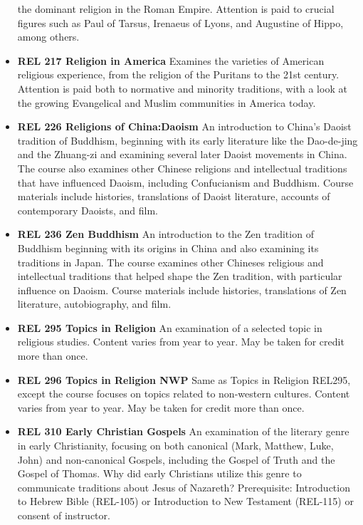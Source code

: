 \documentclass[
  letterpaper,
]{scrbook}
\begin{document}
\begin{itemize}
  the dominant religion in the Roman Empire. Attention is paid to
  crucial figures such as Paul of Tarsus, Irenaeus of Lyons, and
  Augustine of Hippo, among others.\\
\item
  \textbf{REL 217 Religion in America} Examines the varieties of
  American religious experience, from the religion of the Puritans to
  the 21st century. Attention is paid both to normative and minority
  traditions, with a look at the growing Evangelical and Muslim
  communities in America today.
\item
  \textbf{REL 226 Religions of China:Daoism} An introduction to China's
  Daoist tradition of Buddhism, beginning with its early literature like
  the Dao-de-jing and the Zhuang-zi and examining several later Daoist
  movements in China. The course also examines other Chinese religions
  and intellectual traditions that have influenced Daoism, including
  Confucianism and Buddhism. Course materials include histories,
  translations of Daoist literature, accounts of contemporary Daoists,
  and film.\\
\item
  \textbf{REL 236 Zen Buddhism} An introduction to the Zen tradition of
  Buddhism beginning with its origins in China and also examining its
  traditions in Japan. The course examines other Chineses religious and
  intellectual traditions that helped shape the Zen tradition, with
  particular influence on Daoism. Course materials include histories,
  translations of Zen literature, autobiography, and film.
\item
  \textbf{REL 295 Topics in Religion} An examination of a selected topic
  in religious studies. Content varies from year to year. May be taken
  for credit more than once.
\item
  \textbf{REL 296 Topics in Religion NWP} Same as Topics in Religion
  REL295, except the course focuses on topics related to non-western
  cultures. Content varies from year to year. May be taken for credit
  more than once.
\item
  \textbf{REL 310 Early Christian Gospels} An examination of the
  literary genre in early Christianity, focusing on both canonical
  (Mark, Matthew, Luke, John) and non-canonical Gospels, including the
  Gospel of Truth and the Gospel of Thomas. Why did early Christians
  utilize this genre to communicate traditions about Jesus of Nazareth?
  Prerequisite: Introduction to Hebrew Bible (REL-105) or Introduction
  to New Testament (REL-115) or consent of instructor.

\end{itemize}
\end{document}
